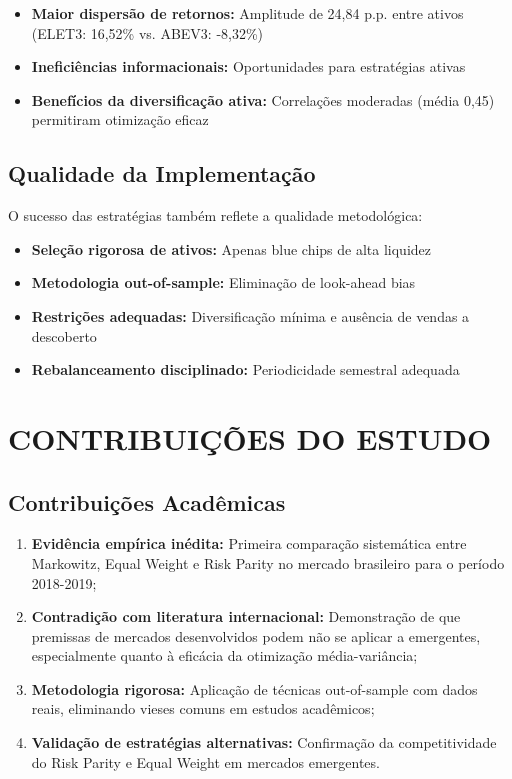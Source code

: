 \begin{itemize}
    \item \textbf{Maior dispersão de retornos:} Amplitude de 24,84 p.p. entre ativos (ELET3: 16,52\% vs. ABEV3: -8,32\%)
    \item \textbf{Ineficiências informacionais:} Oportunidades para estratégias ativas
    \item \textbf{Benefícios da diversificação ativa:} Correlações moderadas (média 0,45) permitiram otimização eficaz
\end{itemize}

\subsection{Qualidade da Implementação}

O sucesso das estratégias também reflete a qualidade metodológica:

\begin{itemize}
    \item \textbf{Seleção rigorosa de ativos:} Apenas blue chips de alta liquidez
    \item \textbf{Metodologia out-of-sample:} Eliminação de look-ahead bias
    \item \textbf{Restrições adequadas:} Diversificação mínima e ausência de vendas a descoberto
    \item \textbf{Rebalanceamento disciplinado:} Periodicidade semestral adequada
\end{itemize}

\section{CONTRIBUIÇÕES DO ESTUDO}

\subsection{Contribuições Acadêmicas}

\begin{enumerate}
    \item \textbf{Evidência empírica inédita:} Primeira comparação sistemática entre Markowitz, Equal Weight e Risk Parity no mercado brasileiro para o período 2018-2019;
    
    \item \textbf{Contradição com literatura internacional:} Demonstração de que premissas de mercados desenvolvidos podem não se aplicar a emergentes, especialmente quanto à eficácia da otimização média-variância;
    
    \item \textbf{Metodologia rigorosa:} Aplicação de técnicas out-of-sample com dados reais, eliminando vieses comuns em estudos acadêmicos;
    
    \item \textbf{Validação de estratégias alternativas:} Confirmação da competitividade do Risk Parity e Equal Weight em mercados emergentes.
\end{enumerate}

